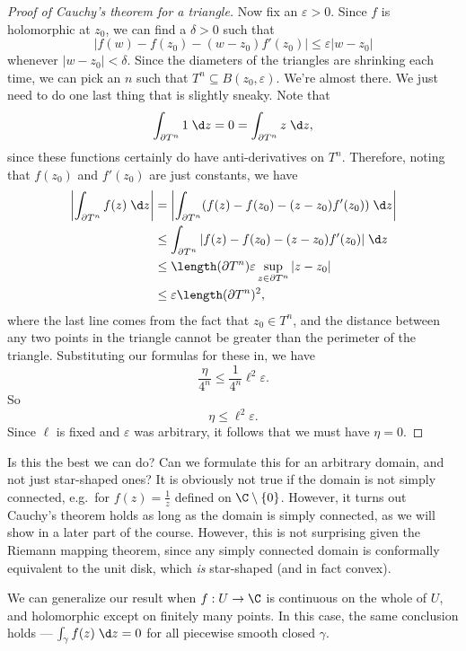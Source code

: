 \documentclass[a4paper]{article}
\begin{document}
\begin{proof}[Proof of Cauchy's theorem for a triangle]
  Now fix an $\varepsilon > 0$. Since $f$ is holomorphic at $z_0$, we can find a $\delta > 0$ such that
  \[
    |f(w) - f(z_0) - (w - z_0) f'(z_0)| \leq \varepsilon|w - z_0|
  \]
  whenever $|w - z_0| < \delta$. Since the diameters of the triangles are shrinking each time, we can pick an $n$ such that $T^n \subseteq B(z_0, \varepsilon)$. We're almost there. We just need to do one last thing that is slightly sneaky. Note that
  \[
    \int_{\partial T^n} 1 \;\d z = 0 = \int_{\partial T^n} z \;\d z,
  \]
  since these functions certainly do have anti-derivatives on $T^n$. Therefore, noting that $f(z_0)$ and $f'(z_0)$ are just constants, we have
  \begin{align*}
    \left|\int_{\partial T^n}f(z)\;\d z\right| &= \left|\int_{\partial T^n} (f(z) - f(z_0) - (z - z_0) f'(z_0))\;\d z\right|\\
    &\leq \int_{\partial T^n} |f(z) - f(z_0) - (z - z_0) f'(z_0)|\;\d z\\
    &\leq \length(\partial T^n) \varepsilon \sup_{z \in \partial T^n}|z - z_0|\\
    &\leq \varepsilon \length(\partial T^n)^2,
  \end{align*}
  where the last line comes from the fact that $z_0 \in T^n$, and the distance between any two points in the triangle cannot be greater than the perimeter of the triangle. Substituting our formulas for these in, we have
  \[
    \frac{\eta}{4^n}\leq \frac{1}{4^n} \ell^2 \varepsilon.
  \]
  So
  \[
    \eta \leq \ell^2 \varepsilon.
  \]
  Since $\ell$ is fixed and $\varepsilon$ was arbitrary, it follows that we must have $\eta = 0$.
\end{proof}
Is this the best we can do? Can we formulate this for an arbitrary domain, and not just star-shaped ones? It is obviously not true if the domain is not simply connected, e.g.\ for $f(z) = \frac{1}{z}$ defined on $\C \setminus \{0\}$. However, it turns out Cauchy's theorem holds as long as the domain is simply connected, as we will show in a later part of the course. However, this is not surprising given the Riemann mapping theorem, since any simply connected domain is conformally equivalent to the unit disk, which \emph{is} star-shaped (and in fact convex).

We can generalize our result when $f: U \to \C$ is continuous on the whole of $U$, and holomorphic except on finitely many points. In this case, the same conclusion holds --- $\int_\gamma f(z)\;\d z = 0$ for all piecewise smooth closed $\gamma$.
\end{document}
